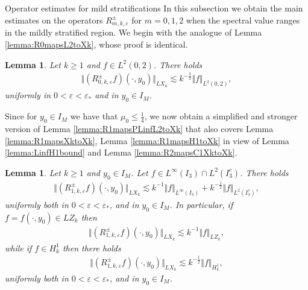 \documentclass[11pt,reqno]{amsproc}
\makeatletter
\renewcommand\subsection{\@startsection{subsection}{2}%
\normalparindent{.5\linespacing\@plus.7\linespacing}{-.5em}
{\normalfont\bfseries}}
\newtheorem{lemma}[proposition]{Lemma}
\theoremstyle{definition}
\numberwithin{equation}{section}
\newcommand{\uv}{{0}}
\newcommand{\ov}{{2}}
\newcommand{\ep}{\varepsilon}
\makeatother
\begin{document}
\subsection{Operator estimates for mild stratifications}
In this subsection we obtain the main estimates on the operators $R_{m,k,\ep}^\pm$ for $m=0,1,2$ when the spectral value ranges in the mildly stratified region. We begin with the analogue of Lemma \ref{lemma:R0mapsL2toXk}, whose proof is identical.

\begin{lemma}\label{lemma:R0mapsL2toLXk}
Let $k\geq 1$ and $f\in L^2(\uv, \ov)$. There holds
\begin{align*}
\Vert (R_{0,k,\ep}^\pm f)(\cdot,y_0) \Vert_{LX_k} \lesssim k^{-\frac32}\Vert f \Vert_{L^2(0,2)},
\end{align*}
uniformly in $0<\ep<\ep_*$ and in $y_0\in I_M$.
\end{lemma}

Since for $y_0\in I_M$ we have that $\mu_0\leq \tfrac14$, we now obtain a simplified and stronger version of Lemma \ref{lemma:R1mapsPLinfL2toXk} that also covers Lemma \ref{lemma:R1mapsXktoXk}, Lemma \ref{lemma:R1mapsH1toXk} in view of Lemma \ref{lemma:LinfH1bound} and Lemma \ref{lemma:R2mapsC1XktoXk}.

\begin{lemma}\label{lemma:R1mapsLinfL2toLXk}
Let $k\geq 1$ and $y_0\in I_M$. Let $f\in L^\infty (I_3)\cap L^2(I_3^c)$. There holds
\begin{align*}
\Vert (R_{1,k,\ep}^\pm f)(\cdot,y_0) \Vert_{LX_k} \lesssim k^{-1} \Vert f \Vert_{L^\infty(I_3)} +  k^{-\frac12} \Vert f \Vert_{L^2(I_3^c)},
\end{align*}
uniformly both in $0<\ep<\ep_*$, and in $y_0\in I_M$. In particular, if $f=f(\cdot,y_0) \in LZ_k$ then 
\begin{align*}
\Vert (R_{1,k,\ep}^\pm f)(\cdot,y_0) \Vert_{LX_k} \lesssim k^{-1} \Vert f \Vert_{LZ_k},
\end{align*}
while if $f\in H_k^1$ then there holds
\begin{align*}
\Vert (R_{1,k,\ep}^\pm f)(\cdot,y_0) \Vert_{LX_k} \lesssim k^{-\frac12} \Vert f \Vert_{H_k^1},
\end{align*}
uniformly both in $0<\ep<\ep_*$, and in $y_0\in I_M$.
\end{lemma}
\end{document}
